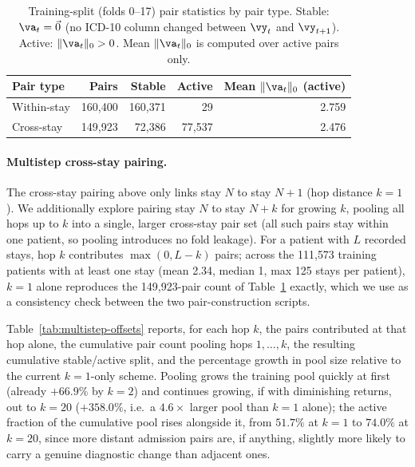 \begin{table}[t]
\caption{Training-split (folds 0--17) pair statistics by pair type. Stable: $\va_t=\vec{0}$ (no ICD-10 column changed between $\vy_t$ and $\vy_{t+1}$). Active: $\lVert\va_t\rVert_0>0$. Mean $\lVert\va_t\rVert_0$ is computed over active pairs only.}
\label{tab:pairing-stats}
\centering
\begin{tabular}{@{}l r r r r@{}}
\toprule
\textbf{Pair type} & \textbf{Pairs} & \textbf{Stable} & \textbf{Active} & \textbf{Mean $\lVert\va_t\rVert_0$ (active)} \\
\midrule
Within-stay & 160{,}400 & 160{,}371 & 29      & 2.759 \\
Cross-stay  & 149{,}923 & 72{,}386  & 77{,}537 & 2.476 \\
\bottomrule
\end{tabular}
\end{table}

\paragraph{Multistep cross-stay pairing.} The cross-stay pairing above only links stay $N$ to stay $N+1$ (hop distance $k=1$). We additionally explore pairing stay $N$ to stay $N+k$ for growing $k$, pooling all hops up to $k$ into a single, larger cross-stay pair set (all such pairs stay within one patient, so pooling introduces no fold leakage). For a patient with $L$ recorded stays, hop $k$ contributes $\max(0, L-k)$ pairs; across the 111{,}573 training patients with at least one stay (mean 2.34, median 1, max 125 stays per patient), $k=1$ alone reproduces the 149{,}923-pair count of Table~\ref{tab:pairing-stats} exactly, which we use as a consistency check between the two pair-construction scripts.

Table~\ref{tab:multistep-offsets} reports, for each hop $k$, the pairs contributed at that hop alone, the cumulative pair count pooling hops $1,\dots,k$, the resulting cumulative stable/active split, and the percentage growth in pool size relative to the current $k=1$-only scheme. Pooling grows the training pool quickly at first (already $+66.9\%$ by $k=2$) and continues growing, if with diminishing returns, out to $k=20$ ($+358.0\%$, i.e.\ a $4.6\times$ larger pool than $k=1$ alone); the active fraction of the cumulative pool rises alongside it, from $51.7\%$ at $k=1$ to $74.0\%$ at $k=20$, since more distant admission pairs are, if anything, slightly more likely to carry a genuine diagnostic change than adjacent ones.

